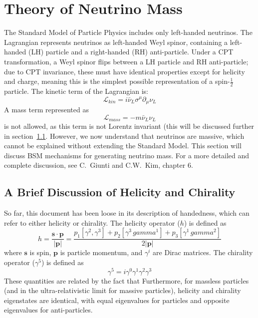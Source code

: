 \documentclass[/main.tex]{subfiles}
\begin{document}
\section{Theory of Neutrino Mass} \label{sec:numasstheory}
The Standard Model of Particle Physics includes only left-handed neutrinos.
The Lagrangian represents neutrinos as left-handed Weyl spinor, containing a left-handed (LH) particle and a right-handed (RH) anti-particle.
Under a CPT transformation, a Weyl spinor flips between a LH particle and RH anti-particle; due to CPT invariance, these must have identical properties except for helicity and charge, meaning this is the simplest possible representation of a spin-$\frac{1}{2}$ particle.
The kinetic term of the Lagrangian is:
\begin{equation}
  \mathcal{L}_{kin}= i\bar\nu_L\sigma^\mu\partial_\mu\nu_L
\end{equation}
A mass term represented as
\begin{equation}
  \mathcal{L}_{mass}=-m\bar\nu_L\nu_L
\end{equation}
is not allowed, as this term is not Lorentz invariant (this will be discussed further in section~\ref{sec:helicitychirality}.
However, we now understand that neutrinos are massive, which cannot be explained without extending the Standard Model.
This section will discuss BSM mechanisms for generating neutrino mass.
For a more detailed and complete discussion, see C.~Giunti and C.W.~Kim, chapter 6\cite{Giunti}.

\subsection{A Brief Discussion of Helicity and Chirality} \label{sec:helicitychirality}
So far, this document has been loose in its description of handedness, which can refer to either helicity or chirality.
The helicity operator ($h$) is defined as
\begin{equation}
  h=\mathbf{\frac{s\cdot p}{|p|}}=\frac{p_1[\gamma^2,\gamma^3]+p_2[\gamma^3\,gamma^1]+p_3[\gamma^1\,gamma^2]}{2|\mathbf{p}|}
\end{equation}
where $\mathbf{s}$ is spin, $\mathbf{p}$ is particle momentum, and $\gamma^i$ are Dirac matrices.
The chirality operator ($\gamma^5$) is defined as 
\begin{equation}
  \gamma^5=i\gamma^0\gamma^1\gamma^2\gamma^3
\end{equation}
These quantities are related by the fact that
Furthermore, for massless particles (and in the ultra-relativistic limit for massive particles), helicity and chirality eigenstates are identical, with equal eigenvalues for particles and opposite eigenvalues for anti-particles.
\end{document}
